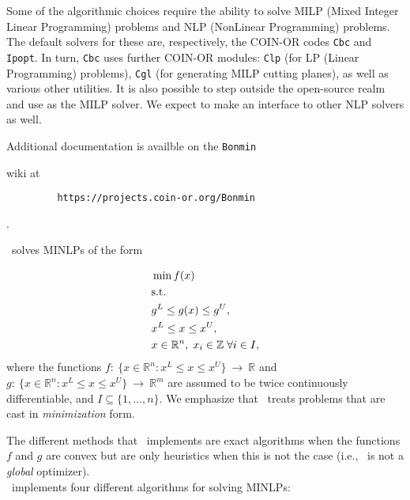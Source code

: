 Some of the algorithmic choices require the ability to solve MILP
(Mixed Integer Linear Programming) problems and NLP (NonLinear
Programming) problems. The default solvers for these are,
respectively, the COIN-OR codes {\tt Cbc} and {\tt Ipopt}. In turn,
{\tt Cbc} uses further COIN-OR modules: {\tt Clp} (for LP (Linear
Programming) problems), {\tt Cgl} (for generating MILP cutting
planes), as well as various other utilities. It is also possible to
step outside the open-source realm and use
as the MILP solver. We expect to make an interface to other NLP solvers as well.

Additional documentation is availble on the {\tt Bonmin}
\begin{latexonly} wiki at 
\begin{verbatim}
         https://projects.coin-or.org/Bonmin
\end{verbatim}
\end{latexonly}
\begin{htmlonly} . \end{htmlonly}
\Bonmin\ solves MINLPs of the form

\begin{align*}
&\min f(x) \\
& {\rm s.t.} \\
&g^L \leq g(x) \leq g^U,\\
& x^L \leq x \leq x^U, \\
&x \in \mathbb{R}^n, \;  x_i \in \mathbb{Z} \; \forall i \in I,
\end{align*}
where the functions $f :~\{x\in \mathbb{R}^n : x^L \leq x \leq x^U
\}~ \rightarrow~\mathbb{R}$ and $g:~\{x\in \mathbb{R}^n : x^L \leq x
\leq x^U \}~\rightarrow~\mathbb{R}^m$ are assumed to be twice
continuously differentiable, and $I \subseteq \{1, \ldots,n \}$. We
emphasize that \Bonmin\ treats problems that are cast
in {\em minimization} form.

The different methods that \Bonmin\ implements are exact algorithms when the functions $f$ and $g$ are
convex but are only heuristics when this is not the case (i.e., \Bonmin\ is not a \emph{global} optimizer).\\

\Bonmin\ implements four different algorithms for solving
MINLPs:

